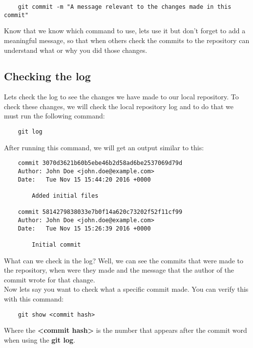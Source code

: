 \documentclass{article}
\begin{document}
\begin{lstlisting}
	git commit -m "A message relevant to the changes made in this commit"
\end{lstlisting}

Know that we know which command to use, lets use it but don't forget to add a meaningful message, so that when others check the commits to the repository can understand what or why you did those changes.\\

\subsection{Checking the log}

Lets check the log to see the changes we have made to our local repository. To check these changes, we will check the local repository log and to do that we must run the following command:

\begin{lstlisting}
	git log
\end{lstlisting}

After running this command, we will get an output similar to this:

\begin{lstlisting}
	commit 3070d3621b60b5ebe46b2d58ad6be2537069d79d
	Author: John Doe <john.doe@example.com>
	Date:   Tue Nov 15 15:44:20 2016 +0000

    	Added initial files

	commit 5814279838033e7b0f14a620c73202f52f11cf99
	Author: John Doe <john.doe@example.com>
	Date:   Tue Nov 15 15:26:39 2016 +0000

    	Initial commit
\end{lstlisting}

What can we check in the log? Well, we can see the commits that were made to the repository, when were they made and the message that the author of the commit wrote for that change.\\

Now lets say you want to check what a specific commit made. You can verify this with this command:

\begin{lstlisting}
	git show <commit hash>
\end{lstlisting}

Where the \textbf{\textless commit hash\textgreater} is the number that appears after the commit word when using the \textbf{git log}.\\
\end{document}
